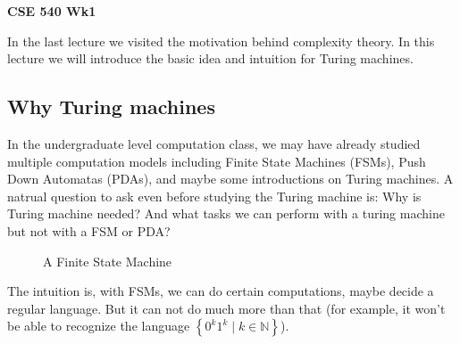 \documentclass[a4paper,12pt]{article}
\date{\displaydate{date}}
\theoremstyle{definition}
\theoremstyle{remark}
\begin{document}

\begin{center}
    \Large \textbf{CSE 540 Wk1} \\ %
    \vspace{0.5cm}
    \large {}
    \vspace{0.5cm}
\end{center}

In the last lecture we visited the motivation behind complexity theory. In this lecture we will introduce the basic idea and intuition for Turing machines.

\subsection{Why Turing machines}

In the undergraduate level computation class, we may have already studied multiple computation models including Finite State Machines (FSMs), Push Down Automatas (PDAs), and maybe some introductions on Turing machines. A natrual question to ask even before studying the Turing machine is: Why is Turing machine needed? And what tasks we can perform with a turing machine but not with a FSM or PDA?



\begin{figure}[h]
    \centering
    \caption{A Finite State Machine}
    \label{fig:fsm}
\end{figure}

The intuition is, with FSMs, we can do certain computations, maybe decide a regular language. But it can not do much more than that (for example, it won't be able to recognize the language $\left\{0^k1^k \mid k \in \mathbb{N} \right\}$).
\end{document}

